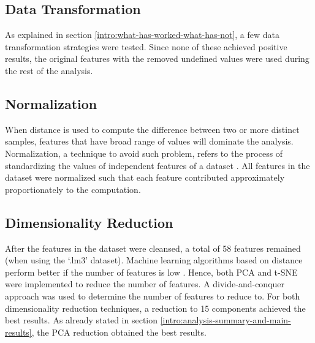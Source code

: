 \subsection{Data Transformation}

As explained in section \ref{intro:what-has-worked-what-has-not}, a few data transformation strategies were tested. Since none of these achieved positive results, the original features with the removed undefined values were used during the rest of the analysis.

\subsection{Normalization}

When distance is used to compute the difference between two or more distinct samples, features that have broad range of values will dominate the analysis. Normalization, a technique to avoid such problem, refers to the process of standardizing the values of independent features of a dataset \cite{data-mining-intro}. All features in the dataset were normalized such that each feature contributed approximately proportionately to the computation.

\subsection{Dimensionality Reduction}

After the features in the dataset were cleansed, a total of 58 features remained (when using the `.lm3' dataset). Machine learning algorithms based on distance perform better if the number of features is low \cite{data-mining-intro}. Hence, both PCA and t-SNE were implemented to reduce the number of features.
A divide-and-conquer approach was used to determine the number of features to reduce to. For both dimensionality reduction techniques, a reduction to 15 components achieved the best results. As already stated in section \ref{intro:analysis-summary-and-main-results}, the PCA reduction obtained the best results.

